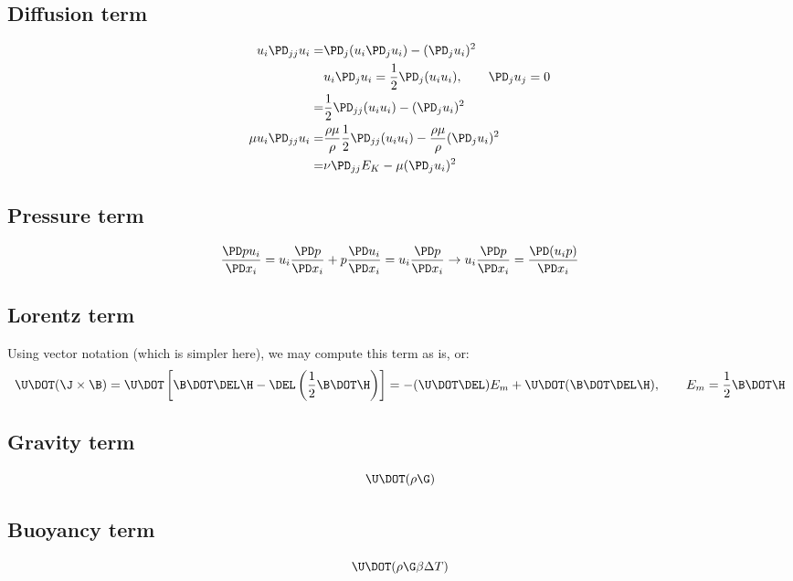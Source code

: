 \documentclass[11pt]{article}
\begin{document}
\subsection{Diffusion term}
\begin{equation}\begin{aligned}
	u_i \PD_{jj} u_i     = & \PD_j (u_i \PD_j u_i ) - (\PD_j u_i)^2  \\
	                       & u_i \PD_j u_i = \frac{1}{2} \PD_j (u_i u_i), \qquad \PD_j u_j = 0 \\
	                     = & \frac{1}{2} \PD_{jj} (u_i u_i) - (\PD_j u_i)^2 \\
	\mu u_i \PD_{jj} u_i = & \frac{\rho \mu}{\rho} \frac{1}{2} \PD_{jj} (u_i u_i) - \frac{\rho \mu}{\rho} (\PD_j u_i)^2 \\
	                     = & \nu \PD_{jj} E_K - \mu (\PD_j u_i)^2 \\
\end{aligned}\end{equation}

\subsection{Pressure term}
\begin{equation}
	\frac{\PD p u_i}{\PD x_i}
	= u_i \frac{\PD p}{\PD x_i}
	+ p \frac{\PD u_i}{\PD x_i}
	= u_i \frac{\PD p}{\PD x_i}
	\rightarrow
	u_i \frac{\PD p}{\PD x_i} =
	\frac{\PD (u_i p)}{\PD x_i}
\end{equation}

\subsection{Lorentz term}
Using vector notation (which is simpler here), we may compute this term as is, or:
\begin{equation}
	\U \DOT (\J \times \B) =
	\U \DOT \left[\B \DOT \DEL \H -\DEL \left( \frac{1}{2} \B \DOT \H \right)\right] =
	- (\U \DOT \DEL) E_m
	+ \U \DOT (\B \DOT \DEL \H)
	,\qquad
	E_m = \frac{1}{2} \B \DOT \H
\end{equation}

\subsection{Gravity term}
\begin{equation}
	\U \DOT (\rho \G)
\end{equation}
\subsection{Buoyancy term}
\begin{equation}
	\U \DOT (\rho \G \beta \Delta T)
\end{equation}
\end{document}
